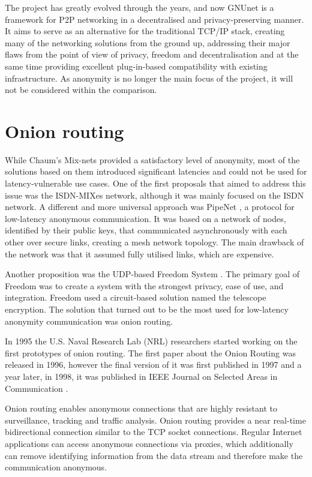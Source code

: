 The project has greatly evolved through the years, and now GNUnet is a framework for P2P networking in a decentralised and privacy-preserving manner. It aims to serve as an alternative for the traditional TCP/IP stack, creating many of the networking solutions from the ground up, addressing their major flaws from the point of view of privacy, freedom and decentralisation and at the same time providing excellent plug-in-based compatibility with existing infrastructure. As anonymity is no longer the main focus of the project, it will not be considered within the comparison.


\section{Onion routing}
While Chaum's Mix-nets provided a satisfactory level of anonymity, most of the solutions based on them introduced significant latencies and could not be used for latency-vulnerable use cases. One of the first proposals that aimed to address this issue was the ISDN-MIXes network, although it was mainly focused on the ISDN network. A different and more universal approach was PipeNet \cite{pipenet}, a protocol for low-latency anonymous communication. It was based on a network of nodes, identified by their public keys, that communicated asynchronously with each other over secure links, creating a mesh network topology. The main drawback of the network was that it assumed fully utilised links, which are expensive.

Another proposition was the UDP-based Freedom System \cite{freedom}. The primary goal of Freedom was to create a system with the strongest privacy, ease of use, and integration. Freedom used a circuit-based solution named the telescope encryption.
The solution that turned out to be the most used for low-latency anonymity communication was onion routing.

In 1995 the U.S. Naval Research Lab (NRL) researchers started working on the first prototypes of onion routing.  The first paper about the Onion Routing was released in 1996, however the final version of it was first published in 1997 and a year later, in 1998, it was published in IEEE Journal on Selected Areas in Communication \cite{onion-routing98}.

Onion routing enables anonymous connections that are highly resistant to surveillance, tracking and traffic analysis. Onion routing provides a near real-time bidirectional connection similar to the TCP socket connections. Regular Internet applications can access anonymous connections via proxies, which additionally can remove identifying information from the data stream and therefore make the communication anonymous.

